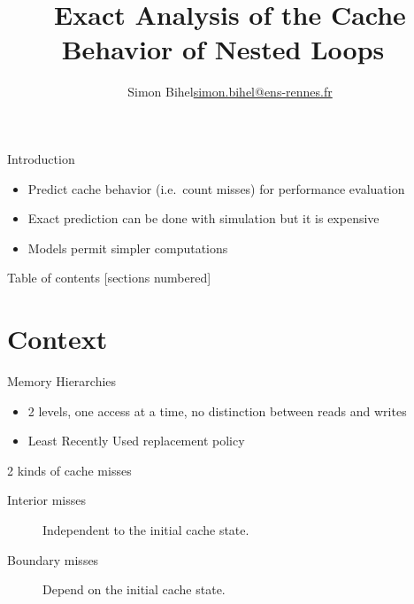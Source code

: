 \documentclass{beamer}
\title{Exact Analysis of the Cache Behavior of Nested Loops~\cite{chatterjee2001exact}}
\date{\displaydate{defensedate}}
\author{%
  Simon Bihel\hfill\url{simon.bihel@ens-rennes.fr} \\
}
\institute{%
  University of Rennes I \\
  \'Ecole Normale Sup\'erieure de Rennes
}
\begin{document}
\maketitle

\begin{frame}{Introduction}
  \begin{itemize}
    \item Predict cache behavior (i.e.\ count misses) for performance evaluation
    \item Exact prediction can be done with simulation but it is expensive
    \item Models permit simpler computations
  \end{itemize}
\end{frame}

\begin{frame}{Table of contents}
  [sections numbered]
  \tableofcontents[hideallsubsections]
\end{frame}


\section{Context}

\begin{frame}{Memory Hierarchies}
  \begin{itemize}
    \item 2 levels, one access at a time, no distinction between reads and writes
    \item Least Recently Used replacement policy
  \end{itemize}

  \pause{}

  2 kinds of cache misses
  \begin{description}
    \item[Interior misses] Independent to the initial cache state.
    \item[Boundary misses] Depend on the initial cache state.
  \end{description}
\end{frame}
\end{document}
